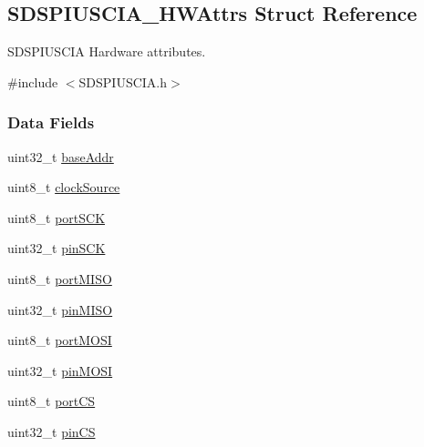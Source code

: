 \subsection{S\-D\-S\-P\-I\-U\-S\-C\-I\-A\-\_\-\-H\-W\-Attrs Struct Reference}
\label{struct_s_d_s_p_i_u_s_c_i_a___h_w_attrs}


S\-D\-S\-P\-I\-U\-S\-C\-I\-A Hardware attributes.  




{\ttfamily \#include $<$S\-D\-S\-P\-I\-U\-S\-C\-I\-A.\-h$>$}

\subsubsection*{Data Fields}
\begin{DoxyCompactItemize}
\item 
uint32\-\_\-t \hyperlink{struct_s_d_s_p_i_u_s_c_i_a___h_w_attrs_a87f31bfb5a18ef1ee74159bea6468b0c}{base\-Addr}
\item 
uint8\-\_\-t \hyperlink{struct_s_d_s_p_i_u_s_c_i_a___h_w_attrs_add9927f11133e234d9f2b7966a277d9a}{clock\-Source}
\item 
uint8\-\_\-t \hyperlink{struct_s_d_s_p_i_u_s_c_i_a___h_w_attrs_a545e93277d0f2f9baa739dd4aa2f522c}{port\-S\-C\-K}
\item 
uint32\-\_\-t \hyperlink{struct_s_d_s_p_i_u_s_c_i_a___h_w_attrs_ade1ffabe6dd56a16961de4cd932c42ed}{pin\-S\-C\-K}
\item 
uint8\-\_\-t \hyperlink{struct_s_d_s_p_i_u_s_c_i_a___h_w_attrs_a03bbc916522b71d1a3c0576524132af7}{port\-M\-I\-S\-O}
\item 
uint32\-\_\-t \hyperlink{struct_s_d_s_p_i_u_s_c_i_a___h_w_attrs_aa29d7994ce14deeefe02f8e23ea2cdad}{pin\-M\-I\-S\-O}
\item 
uint8\-\_\-t \hyperlink{struct_s_d_s_p_i_u_s_c_i_a___h_w_attrs_aee9dcb6e9df720f538cdbe31ecfb4282}{port\-M\-O\-S\-I}
\item 
uint32\-\_\-t \hyperlink{struct_s_d_s_p_i_u_s_c_i_a___h_w_attrs_a533960d70e8a95683825c5569d6044cd}{pin\-M\-O\-S\-I}
\item 
uint8\-\_\-t \hyperlink{struct_s_d_s_p_i_u_s_c_i_a___h_w_attrs_aa10da6b5705fa5bdb6087a7f44374ea1}{port\-C\-S}
\item 
uint32\-\_\-t \hyperlink{struct_s_d_s_p_i_u_s_c_i_a___h_w_attrs_a5d7132ccc67a85fa26e3c1af856410c4}{pin\-C\-S}
\end{DoxyCompactItemize}


